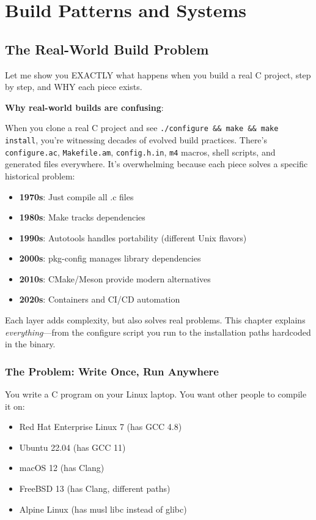 \chapter{Build Patterns and Systems}

\section{The Real-World Build Problem}

Let me show you EXACTLY what happens when you build a real C project, step by step, and WHY each piece exists.

\textbf{Why real-world builds are confusing}:

When you clone a real C project and see \texttt{./configure \&\& make \&\& make install}, you're witnessing decades of evolved build practices. There's \texttt{configure.ac}, \texttt{Makefile.am}, \texttt{config.h.in}, \texttt{m4} macros, shell scripts, and generated files everywhere. It's overwhelming because each piece solves a specific historical problem:

\begin{itemize}
    \item \textbf{1970s}: Just compile all .c files
    \item \textbf{1980s}: Make tracks dependencies
    \item \textbf{1990s}: Autotools handles portability (different Unix flavors)
    \item \textbf{2000s}: pkg-config manages library dependencies
    \item \textbf{2010s}: CMake/Meson provide modern alternatives
    \item \textbf{2020s}: Containers and CI/CD automation
\end{itemize}

Each layer adds complexity, but also solves real problems. This chapter explains \textit{everything}---from the configure script you run to the installation paths hardcoded in the binary.

\subsection{The Problem: Write Once, Run Anywhere}

You write a C program on your Linux laptop. You want other people to compile it on:
\begin{itemize}
    \item Red Hat Enterprise Linux 7 (has GCC 4.8)
    \item Ubuntu 22.04 (has GCC 11)
    \item macOS 12 (has Clang)
    \item FreeBSD 13 (has Clang, different paths)
    \item Alpine Linux (has musl libc instead of glibc)
\end{itemize}

